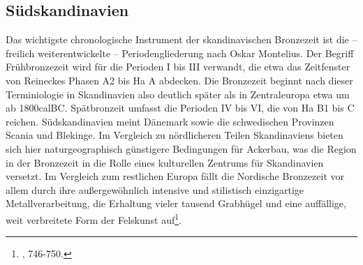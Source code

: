 \documentclass[openany,twoside,twocolumn]{book}
\let\rmarkdownfootnote\footnote%
\def\footnote{\protect\rmarkdownfootnote}
\begin{document}
\hypertarget{sudskandinavien}{%
\subsection{Südskandinavien}\label{sudskandinavien}}

Das wichtigste chronologische Instrument der skandinavischen Bronzezeit
ist die -- freilich weiterentwickelte -- Periodengliederung nach Oskar
Montelius. Der Begriff Frühbronzezeit wird für die Perioden I bis III
verwandt, die etwa das Zeitfenster von Reineckes Phasen A2 bis Ha A
abdecken. Die Bronzezeit beginnt nach dieser Terminiologie in
Skandinavien also deutlich später als in Zentraleuropa etwa um ab
1800calBC. Spätbronzeit umfasst die Perioden IV bis VI, die von Ha B1
bis C reichen. Südskandinavien meint Dänemark sowie die schwedischen
Provinzen Scania und Blekinge. Im Vergleich zu nördlicheren Teilen
Skandinaviens bieten sich hier naturgeographisch günstigere Bedingungen
für Ackerbau, was die Region in der Bronzezeit in die Rolle eines
kulturellen Zentrums für Skandinavien versetzt. Im Vergleich zum
restlichen Europa fällt die Nordische Bronzezeit vor allem durch ihre
außergewöhnlich intensive und stilistisch einzigartige
Metallverarbeitung, die Erhaltung vieler tausend Grabhügel und eine
auffällige, weit verbreitete Form der Felskunst auf\footnote{\textcite{thrane_scandinavia_2013},
  746-750.}.
\end{document}
